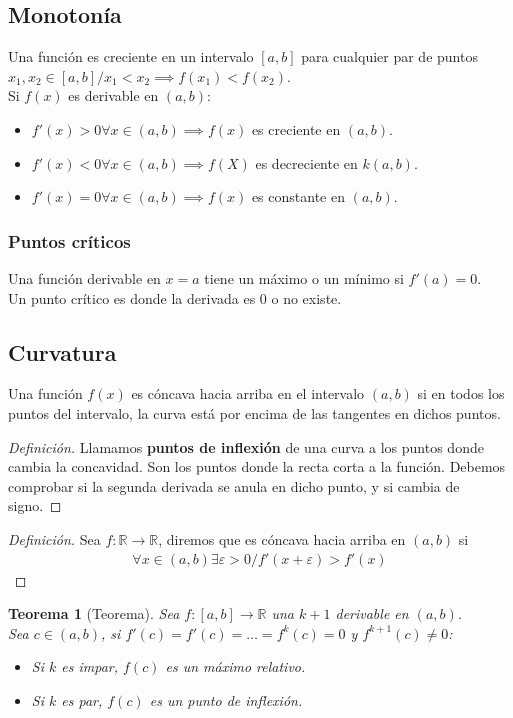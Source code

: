 \documentclass{article}
\newtheorem{derivada_par_impar}{Teorema}
\begin{document}
\subsection{Monotonía}
Una función es creciente en un intervalo $[a,b]$ para cualquier par de
puntos $x_{1},x_{2} \in [a,b] / x_{1} < x_{2} \implies  f(x_{1}) < f(x_{2})$.\\
Si $f(x)$ es derivable en $(a,b)$:
\begin{itemize}
    \item $f'(x) > 0 \forall x \in  (a,b) \implies f(x)$ es creciente en $(a,b)$.
    \item $f'(x) < 0 \forall x \in  (a,b) \implies  f(X)$ es decreciente en $k(a,b)$.
    \item $f'(x) = 0 \forall  x \in (a,b) \implies f(x)$ es constante en $(a,b)$.
\end{itemize}
\subsubsection{Puntos críticos}
Una función derivable en $x=a$ tiene un máximo o un mínimo si $f'(a)=0$.\\
Un punto crítico es donde la derivada es $0$ o no existe.
\subsection{Curvatura}
Una función $f(x)$ es cóncava hacia arriba en el intervalo $(a,b)$ si en
todos los puntos del intervalo, la curva está por encima de las tangentes
en dichos puntos.
\begin{proof}[Definición]
    Llamamos \textbf{puntos de inflexión} de una curva a los puntos donde
    cambia la concavidad. Son los puntos donde la recta corta a la función.
    Debemos comprobar si la segunda derivada se anula en dicho punto, y si
    cambia de signo.
\end{proof}
\begin{proof}[Definición]
    Sea $f: \mathbb{R} \to \mathbb{R}$, diremos que es cóncava hacia arriba
    en $(a,b)$ si
    \begin{equation}
        \begin{split}
            \forall x \in (a,b) \exists \varepsilon > 0 / 
            f'(x+ \varepsilon) > f'(x)
        \end{split}
    \end{equation}
\end{proof}
\begin{derivada_par_impar}[Teorema]
    Sea $f: [a,b] \to \mathbb{R}$ una $k+1$ derivable en $(a,b)$.\\
    Sea $c \in (a,b)$, si $f'(c)=f'(c)=\dots=f^k(c)=0$ y $f^{k+1}(c) \neq 0$:
    \begin{itemize}
        \item Si $k$ es impar, $f(c)$ es un máximo relativo.
        \item Si $k$ es par, $f(c)$ es un punto de inflexión.
    \end{itemize}
    
\end{derivada_par_impar}
\end{document}
